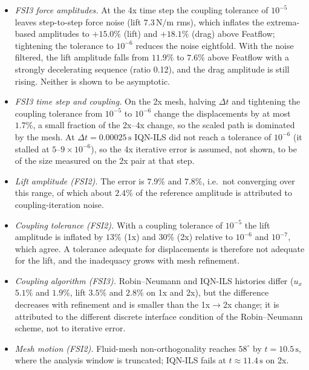 \begin{itemize}
	\item \emph{FSI3 force amplitudes.} At the 4x time step the coupling tolerance of $10^{-5}$ leaves step-to-step force noise (lift $7.3\,\mathrm{N/m}$ rms), which inflates the extrema-based amplitudes to $+15.0\%$ (lift) and $+18.1\%$ (drag) above Featflow; tightening the tolerance to $10^{-6}$ reduces the noise eightfold. With the noise filtered, the lift amplitude falls from $11.9\%$ to $7.6\%$ above Featflow with a strongly decelerating sequence (ratio 0.12), and the drag amplitude is still rising. Neither is shown to be asymptotic.
	\item \emph{FSI3 time step and coupling.} On the 2x mesh, halving $\Delta t$ and tightening the coupling tolerance from $10^{-5}$ to $10^{-6}$ change the displacements by at most $1.7\%$, a small fraction of the 2x--4x change, so the scaled path is dominated by the mesh. At $\Delta t = 0.00025\,\mathrm{s}$ IQN-ILS did not reach a tolerance of $10^{-6}$ (it stalled at $5$--$9\times10^{-6}$), so the 4x iterative error is assumed, not shown, to be of the size measured on the 2x pair at that step.
	\item \emph{Lift amplitude (FSI2).} The error is $7.9\%$ and $7.8\%$, i.e.\ not converging over this range, of which about $2.4\%$ of the reference amplitude is attributed to coupling-iteration noise.
	\item \emph{Coupling tolerance (FSI2).} With a coupling tolerance of $10^{-5}$ the lift amplitude is inflated by $13\%$ (1x) and $30\%$ (2x) relative to $10^{-6}$ and $10^{-7}$, which agree. A tolerance adequate for displacements is therefore not adequate for the lift, and the inadequacy grows with mesh refinement.
	\item \emph{Coupling algorithm (FSI3).} Robin--Neumann and IQN-ILS histories differ ($u_x$ $5.1\%$ and $1.9\%$, lift $3.5\%$ and $2.8\%$ on 1x and 2x), but the difference decreases with refinement and is smaller than the 1x$\to$2x change; it is attributed to the different discrete interface condition of the Robin--Neumann scheme, not to iterative error.
	\item \emph{Mesh motion (FSI2).} Fluid-mesh non-orthogonality reaches $58^\circ$ by $t = 10.5\,\mathrm{s}$, where the analysis window is truncated; IQN-ILS fails at $t \approx 11.4\,\mathrm{s}$ on 2x.
\end{itemize}

